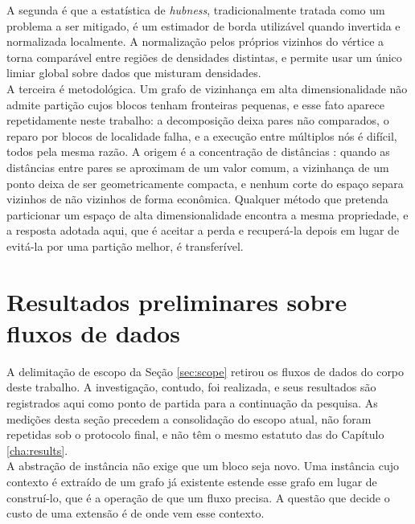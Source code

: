 A segunda é que a estatística de \textit{hubness}, tradicionalmente tratada como um problema a ser mitigado, é um estimador de borda utilizável quando invertida e normalizada localmente. A normalização pelos próprios vizinhos do vértice a torna comparável entre regiões de densidades distintas, e permite usar um único limiar global sobre dados que misturam densidades.\\

A terceira é metodológica. Um grafo de vizinhança em alta dimensionalidade não admite partição cujos blocos tenham fronteiras pequenas, e esse fato aparece repetidamente neste trabalho: a decomposição deixa pares não comparados, o reparo por blocos de localidade falha, e a execução entre múltiplos nós é difícil, todos pela mesma razão. A origem é a concentração de distâncias \cite{beyer,francois}: quando as distâncias entre pares se aproximam de um valor comum, a vizinhança de um ponto deixa de ser geometricamente compacta, e nenhum corte do espaço separa vizinhos de não vizinhos de forma econômica. Qualquer método que pretenda particionar um espaço de alta dimensionalidade encontra a mesma propriedade, e a resposta adotada aqui, que é aceitar a perda e recuperá-la depois em lugar de evitá-la por uma partição melhor, é transferível.\\

\section{Resultados preliminares sobre fluxos de dados\label{sec:fut-streams}}

A delimitação de escopo da Seção \ref{sec:scope} retirou os fluxos de dados do corpo deste trabalho. A investigação, contudo, foi realizada, e seus resultados são registrados aqui como ponto de partida para a continuação da pesquisa. As medições desta seção precedem a consolidação do escopo atual, não foram repetidas sob o protocolo final, e não têm o mesmo estatuto das do Capítulo \ref{cha:results}.\\

A abstração de instância não exige que um bloco seja novo. Uma instância cujo contexto é extraído de um grafo já existente estende esse grafo em lugar de construí-lo, que é a operação de que um fluxo precisa. A questão que decide o custo de uma extensão é de onde vem esse contexto.\\

